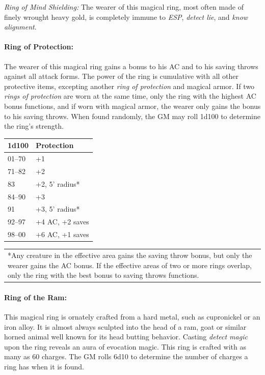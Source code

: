 \begin{multicols}{2}
\textit{Ring of Mind Shielding:} The wearer of this magical ring, most often made of finely wrought heavy gold, is completely immune to \textit{ESP}, \textit{detect lie}, and \textit{know alignment}.

\paragraph{Ring of Protection:} The wearer of this magical ring gains a bonus to his AC and to his saving throws against all attack forms.  The power of the ring is cumulative with all other protective items, excepting another \textit{ring of protection} and magical armor.  If two \textit{rings of protection} are worn at the same time, only the ring with the highest AC bonus functions, and if worn with magical armor, the wearer only gains the bonus to his saving throws.  When found randomly, the GM may roll 1d100 to determine the ring's strength.

\noindent
\begin{tabular}{|p{}|p{}|}
\hline
1d100	& Protection \\
\hline\hline
\rowcolor[gray]{.9}01--70	& +1 \\
71--82	& +2 \\
\rowcolor[gray]{.9}83	& +2, 5' radius* \\
84--90	& +3 \\
\rowcolor[gray]{.9}91	& +3, 5' radius* \\
92--97	& +4 AC, +2 saves \\
\rowcolor[gray]{.9}98--00	& +6 AC, +1 saves \\
\hline
\end{tabular}
\noindent\begin{tabular}{p{}}
*Any creature in the effective area gains the saving throw bonus, but only the wearer gains the AC bonus. If the effective areas of two or more rings overlap, only the ring with the best bonus to saving throws functions. \\
\end{tabular}\vspace{.5em}

\paragraph{Ring of the Ram:} This magical ring is ornately crafted from a hard metal, such as cupronickel or an iron alloy.  It is almost always sculpted into the head of a ram, goat or similar horned animal well known for its head butting behavior.  Casting \textit{detect magic} upon the ring reveals an aura of evocation magic.  This ring is crafted with as many as 60 charges.  The GM rolls 6d10 to determine the number of charges a ring has when it is found.


\end{multicols}
